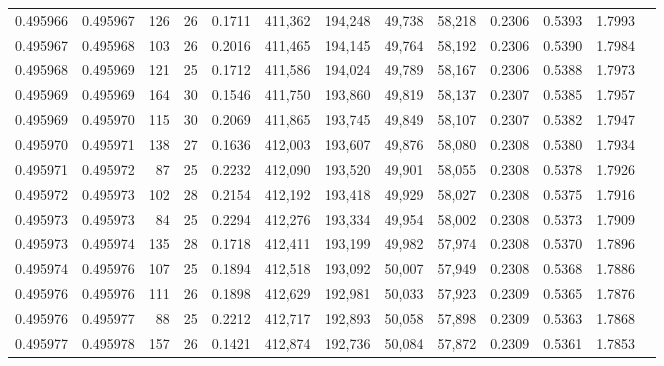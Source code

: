 \begin{tabular}{rrrrrrrrrrrrr}
0.495966 & 0.495967 & 126 &  26 &                                     0.1711 & 411,362 & 194,248 &  49,738 &  58,218 & 0.2306 & 0.5393 & 1.7993 \\
0.495967 & 0.495968 & 103 &  26 &                                     0.2016 & 411,465 & 194,145 &  49,764 &  58,192 & 0.2306 & 0.5390 & 1.7984 \\
0.495968 & 0.495969 & 121 &  25 &                                     0.1712 & 411,586 & 194,024 &  49,789 &  58,167 & 0.2306 & 0.5388 & 1.7973 \\
0.495969 & 0.495969 & 164 &  30 &                                     0.1546 & 411,750 & 193,860 &  49,819 &  58,137 & 0.2307 & 0.5385 & 1.7957 \\
0.495969 & 0.495970 & 115 &  30 &                                     0.2069 & 411,865 & 193,745 &  49,849 &  58,107 & 0.2307 & 0.5382 & 1.7947 \\
0.495970 & 0.495971 & 138 &  27 &                                     0.1636 & 412,003 & 193,607 &  49,876 &  58,080 & 0.2308 & 0.5380 & 1.7934 \\
0.495971 & 0.495972 &  87 &  25 &                                     0.2232 & 412,090 & 193,520 &  49,901 &  58,055 & 0.2308 & 0.5378 & 1.7926 \\
0.495972 & 0.495973 & 102 &  28 &                                     0.2154 & 412,192 & 193,418 &  49,929 &  58,027 & 0.2308 & 0.5375 & 1.7916 \\
0.495973 & 0.495973 &  84 &  25 &                                     0.2294 & 412,276 & 193,334 &  49,954 &  58,002 & 0.2308 & 0.5373 & 1.7909 \\
0.495973 & 0.495974 & 135 &  28 &                                     0.1718 & 412,411 & 193,199 &  49,982 &  57,974 & 0.2308 & 0.5370 & 1.7896 \\
0.495974 & 0.495976 & 107 &  25 &                                     0.1894 & 412,518 & 193,092 &  50,007 &  57,949 & 0.2308 & 0.5368 & 1.7886 \\
0.495976 & 0.495976 & 111 &  26 &                                     0.1898 & 412,629 & 192,981 &  50,033 &  57,923 & 0.2309 & 0.5365 & 1.7876 \\
0.495976 & 0.495977 &  88 &  25 &                                     0.2212 & 412,717 & 192,893 &  50,058 &  57,898 & 0.2309 & 0.5363 & 1.7868 \\
0.495977 & 0.495978 & 157 &  26 &                                     0.1421 & 412,874 & 192,736 &  50,084 &  57,872 & 0.2309 & 0.5361 & 1.7853 \\

\end{tabular}
